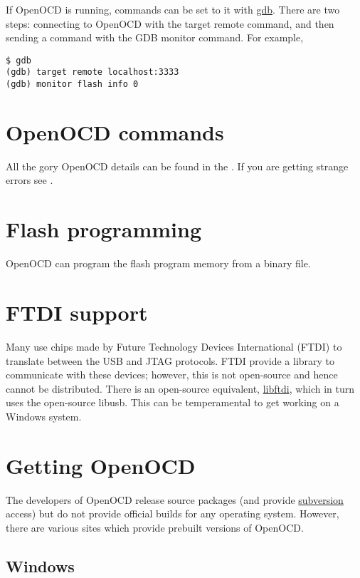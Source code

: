 If OpenOCD is running, commands can be set to it with \url{gdb}. There
are two steps: connecting to OpenOCD with the target remote command, and
then sending a command with the GDB monitor command. For example,

\begin{verbatim}
$ gdb
(gdb) target remote localhost:3333
(gdb) monitor flash info 0
\end{verbatim}

\section{OpenOCD commands}
\label{openocd-commands}

All the gory OpenOCD details can be found in the
. If you are getting strange
errors see .

\section{Flash programming}
\label{flash-programming}

OpenOCD can program the flash program memory from a binary file.

\section{FTDI support}
\label{ftdi-support}

Many  use chips made by Future
Technology Devices International (FTDI) to translate between the USB and
JTAG protocols. FTDI provide a library to communicate with these
devices; however, this is not open-source and hence cannot be
distributed. There is an open-source equivalent,
\href{http://freshmeat.net/projects/libftdi/}{libftdi}, which in turn
uses the open-source libusb. This can be temperamental to get working on
a Windows system.

\section{Getting OpenOCD}
\label{getting-openocd}

The developers of OpenOCD release source packages (and provide
\url{subversion} access) but do not provide official builds for any
operating system. However, there are various sites which provide
prebuilt versions of OpenOCD.

\subsection{Windows}
\label{windows}

